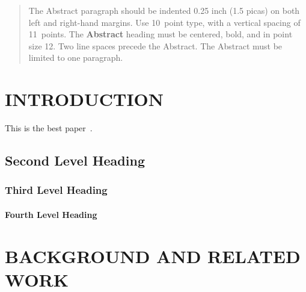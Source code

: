 \documentclass[twoside]{article}
\begin{document}
%

%


\begin{abstract}
  The Abstract paragraph should be indented 0.25 inch (1.5 picas) on
  both left and right-hand margins. Use 10~point type, with a vertical
  spacing of 11~points. The \textbf{Abstract} heading must be centered,
  bold, and in point size 12. Two line spaces precede the
  Abstract. The Abstract must be limited to one paragraph.
\end{abstract}

\section{INTRODUCTION}

This is the best paper~\citep{cusumano2019gen}.

\subsection{Second Level Heading}

\subsubsection{Third Level Heading}

\paragraph{Fourth Level Heading}

\section{BACKGROUND AND RELATED WORK}
\end{document}
